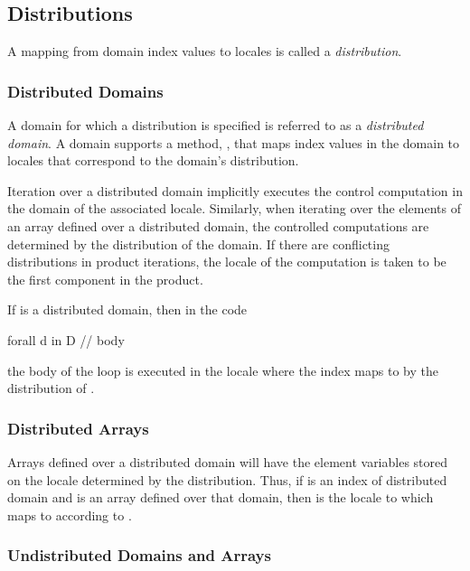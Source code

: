 \subsection{Distributions}
\label{Distributions}

A mapping from domain index values to locales is called a {\em
distribution}.

\subsubsection{Distributed Domains}
\label{Distributed_Domains}

A domain for which a distribution is specified is referred to as a
{\em distributed domain}.  A domain supports a method, ,
that maps index values in the domain to locales that correspond to the
domain's distribution.

Iteration over a distributed domain implicitly executes the control
computation in the domain of the associated locale.  Similarly, when
iterating over the elements of an array defined over a distributed
domain, the controlled computations are determined by the distribution
of the domain.  If there are conflicting distributions in product
iterations, the locale of the computation is taken to be the first
component in the product.

\begin{example}
If  is a distributed domain, then in the code
\begin{chapel}
forall d in D {
  // body
}
\end{chapel}
the body of the loop is executed in the locale where the
index  maps to by the distribution of .
\end{example}

\subsubsection{Distributed Arrays}
\label{Distributed_Arrays}

Arrays defined over a distributed domain will have the element
variables stored on the locale determined by the distribution.  Thus,
if  is an index of distributed domain  and  is
an array defined over that domain, then  is the
locale to which  maps to according to .

\subsubsection{Undistributed Domains and Arrays}
\label{Undistributed_Domains_and_Arrays}

